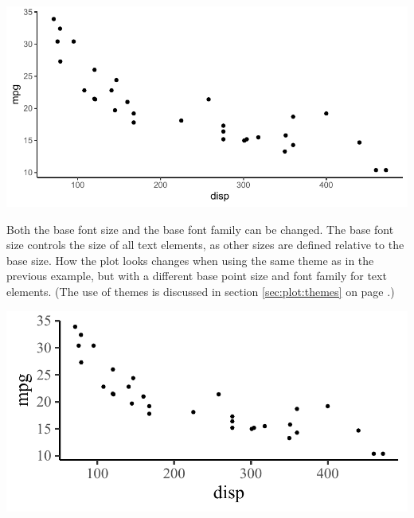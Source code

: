 \documentclass[krantz2]{krantz}\usepackage{knitr}
\begin{document}
\begin{knitrout}\footnotesize
{}\color{fgcolor}\begin{kframe}
\begin{alltt}
\hlstd{(} 
        \hlstd{=} \hlstd{(}    \hlopt{+}
  \hlstd{()} \hlopt{+}
  \hlstd{()}
\end{alltt}
\end{kframe}

{\centering \includegraphics[width=.7\textwidth]{figure/pos-ggplot-basics-09-1} 

}


\end{knitrout}

Both the base font size and the base font family can be changed. The base font size controls the size of all text elements, as other sizes are defined relative to the base size. How the plot looks changes when using the same theme as in the previous example, but with a different base point size and font family for text elements. (The use of themes is discussed in section \ref{sec:plot:themes} on page \pageref{sec:plot:themes}.)

\begin{knitrout}\footnotesize
{}\color{fgcolor}\begin{kframe}
\begin{alltt}
\hlstd{(} 
        \hlstd{=} \hlstd{(}    \hlopt{+}
  \hlstd{()} \hlopt{+}
  \hlstd{(} \hlstd{=} \hlstd{,}  \hlstd{=} \hlstd{)}
\end{alltt}
\end{kframe}

{\centering \includegraphics[width=.7\textwidth]{figure/pos-ggplot-basics-10-1} 

}


\end{knitrout}
\end{document}
